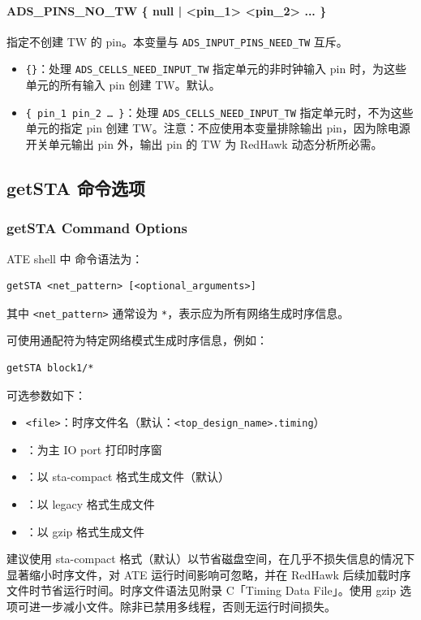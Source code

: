 \paragraph{ADS\_PINS\_NO\_TW \{ null | <pin\_1> <pin\_2> ... \}}
指定不创建 TW 的 pin。本变量与 \texttt{ADS\_INPUT\_PINS\_NEED\_TW} 互斥。
\begin{itemize}
  \item \texttt{\{\}}：处理 \texttt{ADS\_CELLS\_NEED\_INPUT\_TW} 指定单元的非时钟输入 pin 时，为这些单元的所有输入 pin 创建 TW。默认。
  \item \texttt{\{ pin\_1 pin\_2 … \}}：处理 \texttt{ADS\_CELLS\_NEED\_INPUT\_TW} 指定单元时，不为这些单元的指定 pin 创建 TW。注意：不应使用本变量排除输出 pin，因为除电源开关单元输出 pin 外，输出 pin 的 TW 为 RedHawk 动态分析所必需。
\end{itemize}

\subsection{getSTA 命令选项}
\subsubsection*{getSTA Command Options}

ATE shell 中  命令语法为：
\begin{lstlisting}
getSTA <net_pattern> [<optional_arguments>]
\end{lstlisting}
其中 \texttt{<net\_pattern>} 通常设为 \texttt{*}，表示应为所有网络生成时序信息。

可使用通配符为特定网络模式生成时序信息，例如：
\begin{lstlisting}
getSTA block1/*
\end{lstlisting}

可选参数如下：
\begin{itemize}
  \item {} \texttt{<file>}：时序文件名（默认：\texttt{<top\_design\_name>.timing}）
  \item {}：为主 IO port 打印时序窗
  \item {}：以 sta-compact 格式生成文件（默认）
  \item {}：以 legacy 格式生成文件
  \item {}：以 gzip 格式生成文件
\end{itemize}

建议使用 sta-compact 格式（默认）以节省磁盘空间，在几乎不损失信息的情况下显著缩小时序文件，对 ATE 运行时间影响可忽略，并在 RedHawk 后续加载时序文件时节省运行时间。时序文件语法见附录 C「Timing Data File」。使用  gzip 选项可进一步减小文件。除非已禁用多线程，否则无运行时间损失。


